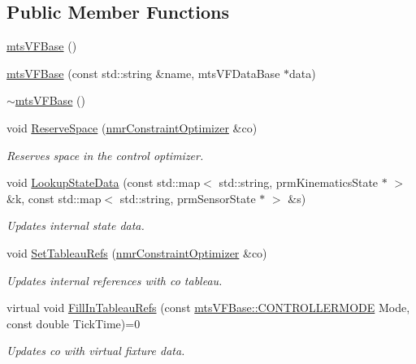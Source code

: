\subsection*{Public Member Functions}
\begin{DoxyCompactItemize}
\item 
\hyperlink{classmts_v_f_base_af45f36da21548b4a27ed600ea297f561}{mts\+V\+F\+Base} ()
\item 
\hyperlink{classmts_v_f_base_a987037c15360ca274ea15bf77566d287}{mts\+V\+F\+Base} (const std\+::string \&name, mts\+V\+F\+Data\+Base $\ast$data)
\item 
\hyperlink{classmts_v_f_base_a2759ee462431dd6812a0d692a9e77421}{$\sim$mts\+V\+F\+Base} ()
\item 
void \hyperlink{classmts_v_f_base_a3e76c6704734935a282808ffeeaf157b}{Reserve\+Space} (\hyperlink{classnmr_constraint_optimizer}{nmr\+Constraint\+Optimizer} \&co)
\begin{DoxyCompactList}\small\item\em Reserves space in the control optimizer. \end{DoxyCompactList}\item 
void \hyperlink{classmts_v_f_base_a4df54b20e4f1ee7207dcb1eb2b13d97a}{Lookup\+State\+Data} (const std\+::map$<$ std\+::string, prm\+Kinematics\+State $\ast$ $>$ \&k, const std\+::map$<$ std\+::string, prm\+Sensor\+State $\ast$ $>$ \&s)
\begin{DoxyCompactList}\small\item\em Updates internal state data. \end{DoxyCompactList}\item 
void \hyperlink{classmts_v_f_base_aaabcfe927229923f30b7722a7d97606e}{Set\+Tableau\+Refs} (\hyperlink{classnmr_constraint_optimizer}{nmr\+Constraint\+Optimizer} \&co)
\begin{DoxyCompactList}\small\item\em Updates internal references with co tableau. \end{DoxyCompactList}\item 
virtual void \hyperlink{classmts_v_f_base_aef5a28675f79945766a2b114c957ae6f}{Fill\+In\+Tableau\+Refs} (const \hyperlink{classmts_v_f_base_a742dd08f8b70bafeb746cec14d9ee974}{mts\+V\+F\+Base\+::\+C\+O\+N\+T\+R\+O\+L\+L\+E\+R\+M\+O\+D\+E} Mode, const double Tick\+Time)=0
\begin{DoxyCompactList}\small\item\em Updates co with virtual fixture data. \end{DoxyCompactList}\item 

\end{DoxyCompactItemize}
